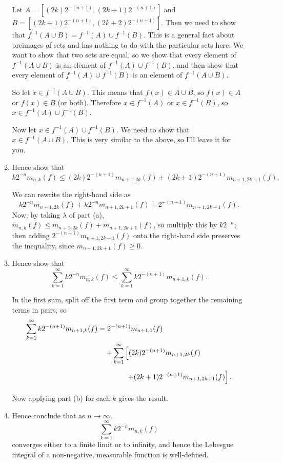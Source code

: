 \documentclass{article}
\begin{document}
\begin{enumerate}
\begin{enumerate}
						{\color{blue}
							Let $A=[(2k)2^{-(n+1)},(2k+1)2^{-(n+1)}]$ and $B=[(2k+1)2^{-(n+1)},(2k+2)2^{-(n+1)}]$. Then we need to show that $f^{-1}(A\cup B)=f^{-1}(A)\cup f^{-1}(B)$. This is a general fact about preimages of sets and has nothing to do with the particular sets here. We want to show that two sets are equal, so we show that every element of $f^{-1}(A\cup B)$ is an element of $f^{-1}(A)\cup f^{-1}(B)$, and then show that every element of $f^{-1}(A)\cup f^{-1}(B)$ is an element of $f^{-1}(A\cup B)$.
							
							So let $x\in f^{-1}(A\cup B)$. This means that $f(x)\in A\cup B$, so $f(x)\in A$ or $f(x)\in B$ (or both). Therefore $x\in f^{-1}(A)$ or $x\in f^{-1}(B)$, so $x\in f^{-1}(A)\cup f^{-1}(B)$.
							
							Now let $x\in f^{-1}(A)\cup f^{-1}(B)$. We need to show that $x\in f^{-1}(A\cup B)$. This is very similar to the above, so I'll leave it for you.
						}
					
			\item Hence show that
				\[k2^{-n}m_{n,k}(f)\leq (2k)2^{-(n+1)}m_{n+1,2k}(f)+(2k+1)2^{-(n+1)}m_{n+1,2k+1}(f).\]
				
						{\color{blue}
							We can rewrite the right-hand side as
							\[k2^{-n}m_{n+1,2k}(f)+k2^{-n}m_{n+1,2k+1}(f)+2^{-(n+1)}m_{n+1,2k+1}(f).\]
							Now, by taking $\lambda$ of part (a), $m_{n,k}(f)\leq m_{n+1,2k}(f)+m_{n+1,2k+1}(f)$, so multiply this by $k2^{-n}$; then adding $2^{-(n+1)}m_{n+1,2k+1}(f)$ onto the right-hand side preserves the inequality, since $m_{n+1,2k+1}(f)\geq 0$.
						}
					
			\item Hence show that
				\[\sum_{k=1}^\infty k2^{-n}m_{n,k}(f)\leq \sum_{k=1}^\infty k2^{-(n+1)}m_{n+1,k}(f).\]
				
						{\color{blue}
							In the first sum, split off the first term and group together the remaining terms in pairs, so
							\begin{align*}
								\sum_{k=1}^\infty k2^{-(n+1)}m_{n+1,k}(f)&=2^{-(n+1)}m_{n+1,1}(f)\\
								&\quad+\sum_{k=1}^\infty \left[(2k)2^{-(n+1)}m_{n+1,2k}(f)\right.\\
								&{\color{white} \quad + \sum_{k=1}^\infty [ ]}\left.+(2k+1)2^{-(n+1)}m_{n+1,2k+1}(f)\right].
							\end{align*}
							Now applying part (b) for each $k$ gives the result.
						}
					
			\item Hence conclude that as $n\to\infty$, 
				\[\sum_{k=1}^\infty k2^{-n}m_{n,k}(f)\]
				converges either to a finite limit or to infinity, and hence the Lebesgue integral of a non-negative, measurable function is well-defined.
				

\end{enumerate}
\end{enumerate}
\end{document}
